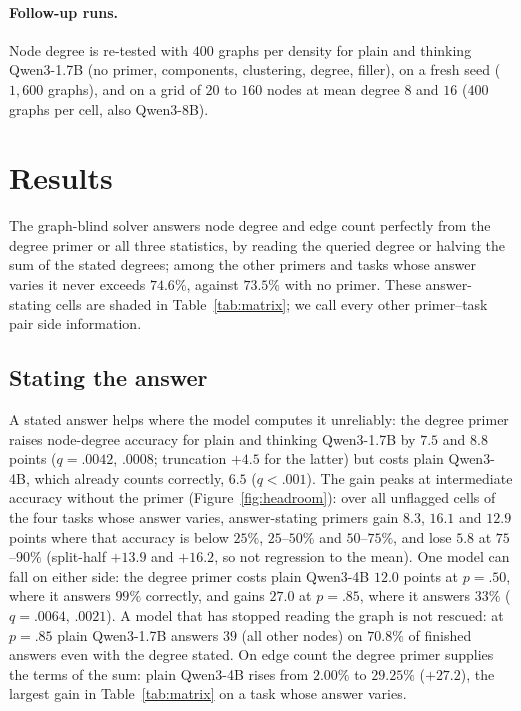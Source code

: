 \documentclass[11pt]{article}
\begin{document}
\paragraph{Follow-up runs.} Node degree is re-tested with $400$ graphs per density for plain and thinking Qwen3-1.7B (no primer, components, clustering, degree, filler), on a fresh seed ($1{,}600$ graphs), and on a grid of $20$ to $160$ nodes at mean degree $8$ and $16$ ($400$ graphs per cell, also Qwen3-8B). %

\section{Results}
\label{sec:results}
The graph-blind solver answers node degree and edge count perfectly from the degree primer or all three statistics, by reading the queried degree or halving the sum of the stated degrees; among the other primers and tasks whose answer varies it never exceeds $74.6\%$, against $73.5\%$ with no primer. %
These answer-stating cells are shaded in Table~\ref{tab:matrix}; we call every other primer--task pair side information.

\subsection{Stating the answer}
A stated answer helps where the model computes it unreliably: the degree primer raises node-degree accuracy for plain and thinking Qwen3-1.7B by $7.5$ and $8.8$ points ($q=.0042$, $.0008$; truncation $+4.5$ for the latter) but costs plain Qwen3-4B, which already counts correctly, $6.5$ ($q<.001$). %
The gain peaks at intermediate accuracy without the primer (Figure~\ref{fig:headroom}): over all unflagged cells of the four tasks whose answer varies, answer-stating primers gain $8.3$, $16.1$ and $12.9$ points where that accuracy is below $25\%$, $25$--$50\%$ and $50$--$75\%$, and lose $5.8$ at $75$--$90\%$ (split-half $+13.9$ and $+16.2$, so not regression to the mean). %
One model can fall on either side: the degree primer costs plain Qwen3-4B $12.0$ points at $p=.50$, where it answers $99\%$ correctly, and gains $27.0$ at $p=.85$, where it answers $33\%$ ($q=.0064$, $.0021$). %
A model that has stopped reading the graph is not rescued: at $p=.85$ plain Qwen3-1.7B answers $39$ (all other nodes) on $70.8\%$ of finished answers even with the degree stated. %
On edge count the degree primer supplies the terms of the sum: plain Qwen3-4B rises from $2.00\%$ to $29.25\%$ ($+27.2$), the largest gain in Table~\ref{tab:matrix} on a task whose answer varies. %
\end{document}
